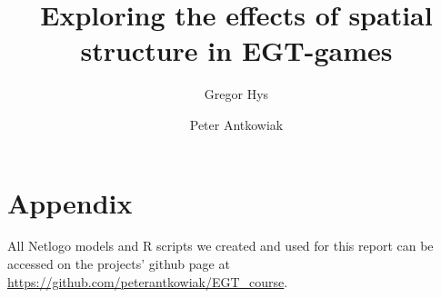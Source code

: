 \documentclass{article}
\title{Exploring the effects of spatial structure in EGT-games}
\author{Gregor Hys \and Peter Antkowiak}
\newcommand{\HRule}{\rule{\linewidth}{0.5mm}}
\begin{document}
\maketitle


\vfill
	




\newpage

\twocolumn
\sloppy












\section*{Appendix}
All Netlogo models and R scripts we created and used for this report can be accessed on the projects' github page at \href{https://github.com/peterantkowiak/EGT_course}{https://github.com/peterantkowiak/EGT\_course}. 


\onecolumn

\newpage
\newpage



\end{document}
